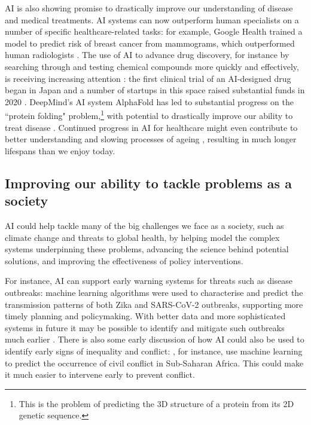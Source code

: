 \documentclass{article}
\begin{document}
AI is also showing promise to drastically improve our understanding of disease and medical treatments. AI systems can now outperform human specialists on a number of specific healthcare-related tasks: for example, Google Health trained a model to predict risk of breast cancer from mammograms, which outperformed human radiologists \citep{mckinney_international_2020}. The use of AI to advance drug discovery, for instance by searching through and testing chemical compounds more quickly and effectively, is receiving increasing attention \citep{paul_artificial_2021}: the first clinical trial of an AI-designed drug began in Japan \citep{burki_new_2020} and a number of startups in this space raised substantial funds in 2020 \citep{hogarth_state_2020}. DeepMind’s AI system AlphaFold has led to substantial progress on the ``protein folding" problem,\footnote{This is the problem of predicting the 3D structure of a protein from its 2D genetic sequence.} with potential to drastically improve our ability to treat disease \citep{jumper_highly_2021}. Continued progress in AI for healthcare might even contribute to better understanding and slowing processes of ageing \citep{zhavoronkov_artificial_2019}, resulting in much longer lifespans than we enjoy today.

\subsection{Improving our ability to tackle problems as a society}

AI could help tackle many of the big challenges we face as a society, such as climate change and threats to global health, by helping model the complex systems underpinning these problems, advancing the science behind potential solutions, and improving the effectiveness of policy interventions.

For instance, AI can support early warning systems for threats such as disease outbreaks: machine learning algorithms were used to characterise and predict the transmission patterns of both Zika \citep{jiang_mapping_2018} and SARS-CoV-2 \citep{wu_nowcasting_2020,liu_deployment_2020} outbreaks, supporting more timely planning and policymaking. With better data and more sophisticated systems in future it may be possible to identify and mitigate such outbreaks much earlier \citep{schwalbe_artificial_2020}. There is also some early discussion of how AI could also be used to identify early signs of inequality and conflict: \citet{musumba_prevention_2021}, for instance, use machine learning to predict the occurrence of civil conflict in Sub-Saharan Africa. This could make it much easier to intervene early to prevent conflict.
\end{document}
